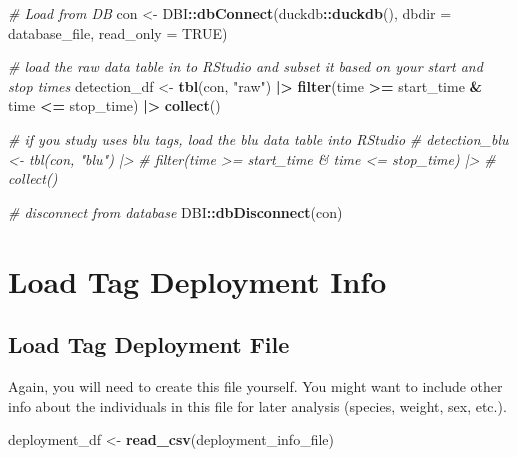 \documentclass[
]{book}
\newenvironment{Shaded}{\begin{snugshade}}{\end{snugshade}}
\newcommand{\AttributeTok}[1]{\textcolor[rgb]{0.13,0.29,0.53}{#1}}
\newcommand{\CommentTok}[1]{\textcolor[rgb]{0.56,0.35,0.01}{\textit{#1}}}
\newcommand{\ConstantTok}[1]{\textcolor[rgb]{0.56,0.35,0.01}{#1}}
\newcommand{\FunctionTok}[1]{\textcolor[rgb]{0.13,0.29,0.53}{\textbf{#1}}}
\newcommand{\NormalTok}[1]{#1}
\newcommand{\OtherTok}[1]{\textcolor[rgb]{0.56,0.35,0.01}{#1}}
\newcommand{\SpecialCharTok}[1]{\textcolor[rgb]{0.81,0.36,0.00}{\textbf{#1}}}
\newcommand{\StringTok}[1]{\textcolor[rgb]{0.31,0.60,0.02}{#1}}
\begin{document}
\begin{Shaded}
\begin{Highlighting}[]
\CommentTok{\# Load from DB}
\NormalTok{con }\OtherTok{\textless{}{-}}\NormalTok{ DBI}\SpecialCharTok{::}\FunctionTok{dbConnect}\NormalTok{(duckdb}\SpecialCharTok{::}\FunctionTok{duckdb}\NormalTok{(), }
                      \AttributeTok{dbdir =}\NormalTok{ database\_file, }
                      \AttributeTok{read\_only =} \ConstantTok{TRUE}\NormalTok{)}

\CommentTok{\# load the raw data table in to RStudio and subset it based on your start and stop times}
\NormalTok{detection\_df }\OtherTok{\textless{}{-}} \FunctionTok{tbl}\NormalTok{(con, }\StringTok{"raw"}\NormalTok{) }\SpecialCharTok{|\textgreater{}} 
  \FunctionTok{filter}\NormalTok{(time }\SpecialCharTok{\textgreater{}=}\NormalTok{ start\_time }\SpecialCharTok{\&}\NormalTok{ time }\SpecialCharTok{\textless{}=}\NormalTok{ stop\_time) }\SpecialCharTok{|\textgreater{}}
  \FunctionTok{collect}\NormalTok{()}

\CommentTok{\# if you study uses blu tags, load the blu data table into RStudio}
\CommentTok{\# detection\_blu \textless{}{-} tbl(con, "blu") |\textgreater{} }
\CommentTok{\#   filter(time \textgreater{}= start\_time \& time \textless{}= stop\_time) |\textgreater{}}
\CommentTok{\#   collect()}

\CommentTok{\# disconnect from database}
\NormalTok{DBI}\SpecialCharTok{::}\FunctionTok{dbDisconnect}\NormalTok{(con)}
\end{Highlighting}
\end{Shaded}

\section{Load Tag Deployment Info}\label{load-tag-deployment-info}

\subsection{Load Tag Deployment File}\label{load-tag-deployment-file}

Again, you will need to create this file yourself. You might want to include other info about the individuals in this file for later analysis (species, weight, sex, etc.).

\begin{Shaded}
\begin{Highlighting}[]
\NormalTok{deployment\_df }\OtherTok{\textless{}{-}} \FunctionTok{read\_csv}\NormalTok{(deployment\_info\_file)}
\end{Highlighting}
\end{Shaded}
\end{document}
